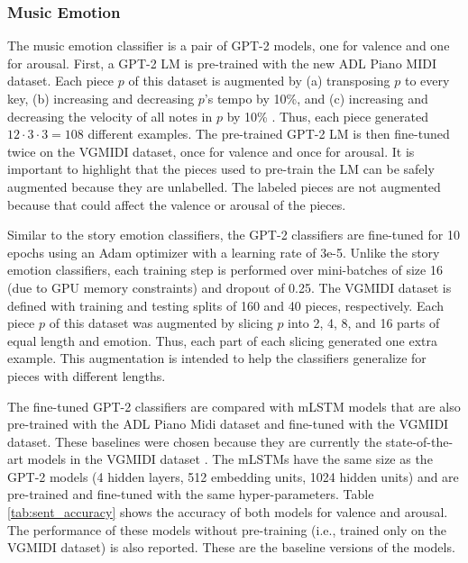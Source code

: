 \subsubsection{Music Emotion}

The music emotion classifier is a pair of GPT-2 models, one for valence and one for arousal. First, a GPT-2 LM is pre-trained with the new ADL Piano MIDI dataset. Each piece $p$ of this dataset is augmented by (a) transposing $p$ to every key, (b) increasing and decreasing $p$'s tempo by 10\%, and (c) increasing and decreasing the velocity of all notes in $p$ by 10\% \cite{oore2017learning}. Thus, each piece generated $12 \cdot 3 \cdot 3 = 108$ different examples. The pre-trained GPT-2 LM is then fine-tuned twice on the VGMIDI dataset, once for valence and once for arousal. It is important to highlight that the pieces used to pre-train the LM can be safely augmented because they are unlabelled. The labeled pieces are not augmented because that could affect the valence or arousal of the pieces.

Similar to the story emotion classifiers, the GPT-2 classifiers are fine-tuned for 10 epochs using an Adam optimizer with a learning rate of 3e-5. Unlike the story emotion classifiers, each training step is performed over mini-batches of size 16 (due to GPU memory constraints) and dropout of 0.25. The VGMIDI dataset is defined with training and testing splits of 160 and 40 pieces, respectively. Each piece $p$ of this dataset was augmented by slicing $p$ into 2, 4, 8, and 16 parts of equal length and emotion. Thus, each part of each slicing generated one extra example. This augmentation is intended to help the classifiers generalize for pieces with different lengths.

The fine-tuned GPT-2 classifiers are compared with mLSTM models that are also pre-trained with the ADL Piano Midi dataset and fine-tuned with the VGMIDI dataset. These baselines were chosen because they are currently the state-of-the-art models in the VGMIDI dataset \cite{ferreira_2019}. The mLSTMs have the same size as the GPT-2 models (4 hidden layers, 512 embedding units, 1024 hidden units) and are pre-trained and fine-tuned with the same hyper-parameters. Table \ref{tab:sent_accuracy} shows the accuracy of both models for valence and arousal. The performance of these models without pre-training (i.e., trained only on the VGMIDI dataset) is also reported. These are the baseline versions of the models.

